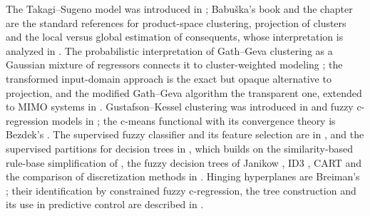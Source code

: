 The Takagi--Sugeno model was introduced in \cite{takagi:1985}; Babu\v{s}ka's book \cite{babuska:1998:book} and the chapter \cite{babuska:1997:productspace} are the standard references for product-space clustering, projection of clusters and the local versus global estimation of consequents, whose interpretation is analyzed in \cite{abonyi:2000:localglobal,johansen:2000:interpretation}. The probabilistic interpretation of Gath--Geva clustering \cite{gath:1989} as a Gaussian mixture of regressors connects it to cluster-weighted modeling \cite{gershenfeld:1999:cwm}; the transformed input-domain approach \cite{kim:1998:transformed} is the exact but opaque alternative to projection, and the modified Gath--Geva algorithm \cite{abonyi:2002:mgg} the transparent one, extended to MIMO systems in \cite{abonyi:2002:mimo,feil:2004:mimo}. Gustafson--Kessel clustering was introduced in \cite{gustafson:1979} and fuzzy c-regression models in \cite{hathaway:1993:fcrm}; the c-means functional with its convergence theory is Bezdek's \cite{bezdek:1981}. The supervised fuzzy classifier and its feature selection are in \cite{abonyi:2003:supervised}, and the supervised partitions for decision trees in \cite{abonyi:2010:partition}, which builds on the similarity-based rule-base simplification of \cite{setnes:1998:similarity}, the fuzzy decision trees of Janikow \cite{janikow:1998:fid}, ID3 \cite{quinlan:1986:id3}, CART \cite{breiman:1984:cart} and the comparison of discretization methods in \cite{dougherty:1995:discretization}. Hinging hyperplanes are Breiman's \cite{breiman:1993:hinge}; their identification by constrained fuzzy c-regression, the tree construction and its use in predictive control are described in \cite{kenesei:2013:hinge}.
